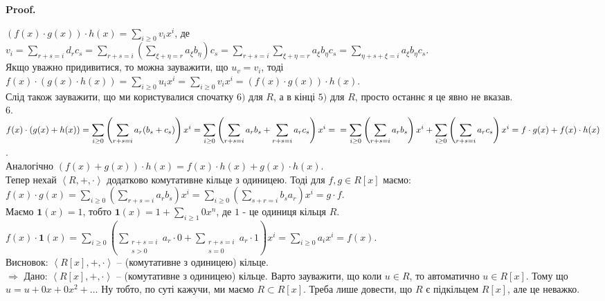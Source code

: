 \documentclass[a4paper, 10pt]{article}
\makeatletter
\def\rightproof{$\boxed{\Rightarrow}$ }
\theoremstyle{theoremdd}
\theoremstyle{theoremdd}
\theoremstyle{theoremdd}
\theoremstyle{theoremdd}
\theoremstyle{theoremdd}
\theoremstyle{theoremdd}
\theoremstyle{theoremdd}
\theoremstyle{theoremdd}
\theoremstyle{theoremdd}
\theoremstyle{theoremdd}
\theoremstyle{theoremdd}
\theoremstyle{theoremdd}
\theoremstyle{theoremdd}
\theoremstyle{theoremdd}
\theoremstyle{theoremdd}
\renewenvironment{proof}[1][Proof.\\]{\par
\pushQED{\hfill \qed}%
\normalfont \topsep6\p@\@plus6\p@\relax
\trivlist
\item\relax
{\bfseries
#1\@addpunct{.}}\hspace\labelsep\ignorespaces
}{%
\popQED\endtrivlist\@endpefalse
}
\makeatother
\begin{document}
\begin{proof}
$(f(x) \cdot g(x)) \cdot h(x) = \displaystyle\sum_{i \geq 0}v_i x^i$, де \\
$v_i = \displaystyle\sum_{r+s=i} d_r c_s = \sum_{r+s=i} \left( \sum_{\xi + \eta = r} a_\xi b_\eta \right) c_s = \sum_{r+s=i} \sum_{\xi + \eta = r} a_\xi b_\eta c_s = \sum_{\eta + s + \xi = i} a_\xi b_\eta c_s$.\\
Якщо уважно придивитися, то можна зауважити, що $u_v = v_i$, тоді\\
$f(x) \cdot (g(x) \cdot h(x)) = \displaystyle\sum_{i \geq 0} u_i x^i = \sum_{i \geq 0} v_i x^i = (f(x) \cdot g(x)) \cdot h(x)$.\\
Слід також зауважити, що ми користувалися спочатку $6)$ для $R$, а в кінці $5)$ для $R$, просто останнє я це явно не вказав.
\bigskip \\
6. $f(x) \cdot (g(x)+h(x)) = \displaystyle\sum_{i \geq 0} \left( \sum_{r+s=i} a_r (b_s + c_s) \right) x^i = \sum_{i \geq 0} \left( \sum_{r+s=i} a_r b_s + \sum_{r+s=i} a_r c_s \right) x^i = \\ =\sum_{i \geq 0} \left( \sum_{r+s=i} a_r b_s \right) x^i + \sum_{i \geq 0} \left( \sum_{r+s=i} a_r c_s \right) x^i = f \cdot g(x) + f(x) \cdot h(x)$.\\
Аналогічно $(f(x)+g(x)) \cdot h(x) = f(x) \cdot h(x) + g(x) \cdot h(x)$.
\bigskip \\
Тепер нехай $\left< R,+,\cdot\right>$ додатково комутативне кільце з одиницею. Тоді для $f,g \in R[x]$ маємо:\\
$f(x) \cdot g(x) = \displaystyle\sum_{i \geq 0} \left( \sum_{r+s=i} a_r b_s \right)x^i = \sum_{i \geq 0} \left( \sum_{s+r=i} b_s a_r \right)x^i = g \cdot f$.\\
Маємо $\textbf{1}(x) = 1$, тобто $\textbf{1}(x) = 1 + \displaystyle\sum_{i \geq 1} 0x^n$, де $1$ - це одиниця кільця $R$.\\
$f(x) \cdot \textbf{1}(x) = \displaystyle\sum_{i \geq 0} \left( \sum_{\substack{r+s=i \\ s > 0}} a_r \cdot 0 + \sum_{\substack{r+s=i \\ s=0}} a_r \cdot 1 \right) x^i = \sum_{i \geq 0} a_i x^i = f(x)$.\\
Висновок: $\left< R[x],+,\cdot\right>$ -- (комутативне з одиницею) кільце.
\bigskip \\
\rightproof Дано: $\left< R[x],+,\cdot\right>$ -- (комутативне з одиницею) кільце. Варто зауважити, що коли $u \in R$, то автоматично $u \in R[x]$. Тому що $u = u + 0x + 0x^2 + \dots$ Ну тобто, по суті кажучи, ми маємо $R \subset R[x]$. Треба лише довести, що $R$ є підкільцем $R[x]$, але це неважко.
\end{proof}
\end{document}

